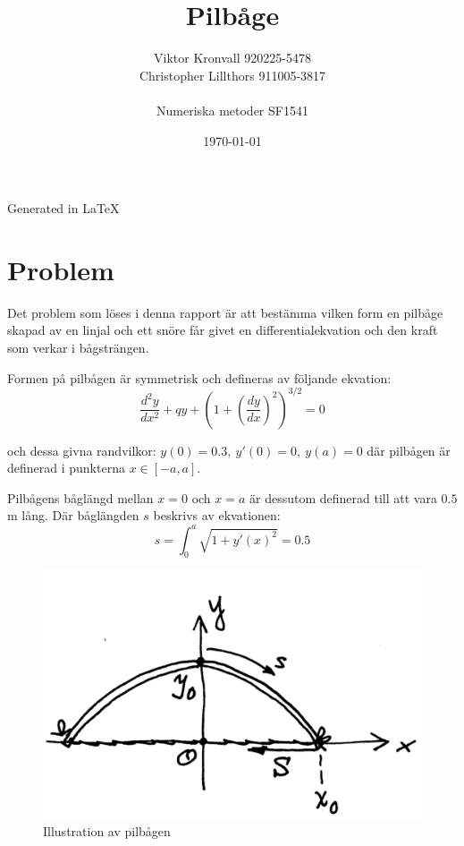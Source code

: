 \documentclass[a4paper,11pt,twoside]{article}
\title{Pilbåge}
\author{
  Viktor Kronvall 920225-5478 \\
  Christopher Lillthors 911005-3817 \\
  \\
  Numeriska metoder SF1541
}
\date{\today}
\begin{document}
\maketitle
\begin{frame}
\null
\vfill
Generated in \LaTeX
\end{frame}
\thispagestyle{empty}
\newpage
\tableofcontents
\thispagestyle{empty}
\newpage
\clearpage
\setcounter{page}{1}
\section{Problem}
Det problem som löses i denna rapport är att bestämma vilken form en pilbåge skapad av en linjal och ett snöre får givet en differentialekvation och den kraft som verkar i bågsträngen.

Formen på pilbågen är symmetrisk och defineras av följande ekvation:
\begin{equation} \label{eq:original}
	\dfrac{d^2y}{dx^2} + qy + \left(1+\left(\dfrac{dy}{dx}\right)^2\right)^{3/2} = 0
\end{equation}

och dessa givna randvilkor: $y(0)=0.3,\: y'(0)=0,\: y(a)=0$ där pilbågen är definerad i punkterna $x \in [-a,a]$.

Pilbågens båglängd mellan $x=0$ och $x=a$ är dessutom definerad till att vara $0.5$m lång. Där båglängden $s$ beskrivs av ekvationen:
\begin{equation}
s = \int_0^a{\sqrt{1+y'(x)^2}}=0.5 \nonumber
\end{equation}
\begin{figure}[h!]
\caption{Illustration av pilbågen}
\centering
\includegraphics[scale=0.3]{bild.png}
\end{figure}
\newpage
\end{document}

